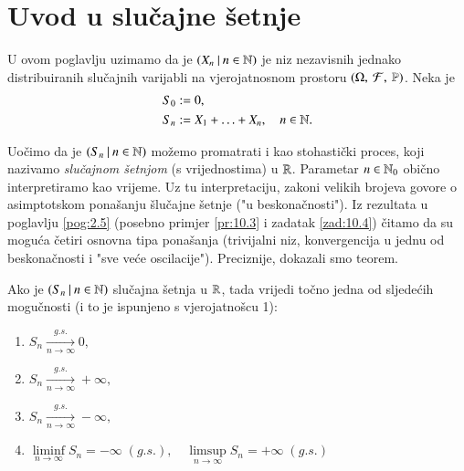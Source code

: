 
\chapter{Uvod u slu\v cajne \v setnje}

U ovom poglavlju uzimamo da je $({X_n} \: | \: {n \in \mathbb{N}})$ je niz nezavisnih jednako distribuiranih slu\v cajnih varijabli na vjerojatnosnom prostoru $(\Omega, \: \mathcal{F}, \: \mathbb{P})$.
Neka je
\begin{equation*}
    \begin{aligned}
        S_0 &:= 0,\\
        S_n &:= X_1 + \ldots + X_n, \quad n \in \mathbb{N}.
    \end{aligned}
\end{equation*}

Uo\v cimo da je $({S_n} \: | \: {n \in \mathbb{N}})$ mo\v zemo promatrati i kao stohasti\v cki proces, koji nazivamo \emph{slu\v cajnom \v setnjom} (s vrijednostima) u $\mathbb{R}$.
Parametar $n \in \mathbb{N}_0$ obi\v cno interpretiramo kao vrijeme.
Uz tu interpretaciju, zakoni velikih brojeva govore o asimptotskom pona\v sanju \v slu\v cajne \v setnje ("u beskona\v cnosti").
Iz rezultata u poglavlju \ref{pog:2.5} (posebno primjer \ref{pr:10.3} i zadatak \ref{zad:10.4}) \v citamo da su mogu\' ca \v cetiri osnovna tipa pona\v sanja (trivijalni niz, konvergencija u jednu od beskona\v cnosti i "sve ve\' ce oscilacije").
Preciznije, dokazali smo teorem.

\begin{tm}  \label{tm:15.1}
    Ako je $({S_n} \: | \: {n \in \mathbb{N}})$ slu\v cajna \v setnja u $\mathbb{R}$, tada vrijedi to\v cno jedna od sljede\' cih mogu\v cnosti (i to je ispunjeno s vjerojatno\v scu 1):
    \begin{enumerate}[label=(\roman*)]
        \item \label{tm:15.1.1}
        $S_n \xrightarrow[n \to \infty]{g.s.} 0,$
        \item \label{tm:15.1.2}
        $S_n \xrightarrow[n \to \infty]{g.s.} +\infty,$
        \item \label{tm:15.1.3}
        $S_n \xrightarrow[n \to \infty]{g.s.} -\infty,$
        \item \label{tm:15.1.4}
        $\liminf\limits_{n \to \infty} S_n = - \infty \; (g.s.), \quad \limsup\limits_{n \to \infty} S_n = + \infty \; (g.s.)$
    \end{enumerate}
\end{tm}

